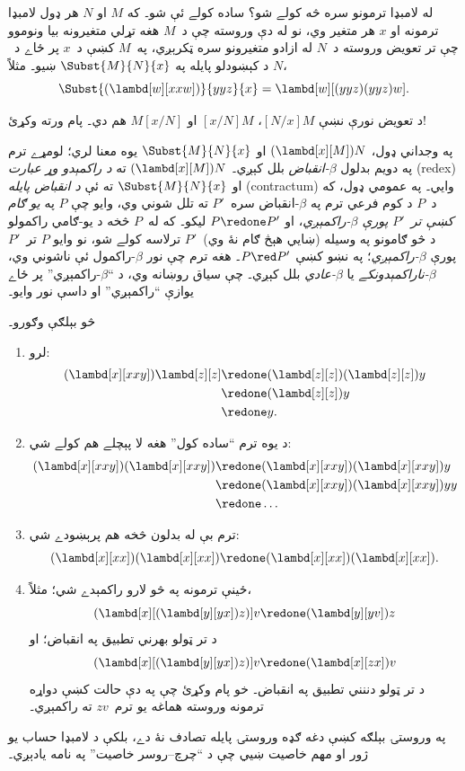 \documentclass[../../../include/open-logic-section]{subfiles}
\begin{document}

له لامبډا ترمونو سره څه کولے شو؟ ساده کولے ئې شو۔ که $M$ او $N$ هر ډول
لامبډا ترمونه او $x$ هر متغير وي، نو له دې وروسته چې د~$M$ هغه تړلي
متغيرونه بيا ونوموو چې تر تعويض وروسته د~$N$ له ازادو متغيرونو سره
ټکرېږي، په~$M$ کښې د~$x$ پر ځاے د~$N$ د کېښودلو پايله په
$\Subst{M}{N}{x}$ ښيو۔ مثلاً،
\[
\Subst{(\lambd[w][xxw])}{yyz}{x} = \lambd[w][(yyz)(yyz)w].
\]

\begin{digress}
د تعويض نورې نښې $[N/x]M$، $[x/N]M$ او $M[x/N]$ هم دي۔ پام
ورته وکړئ!
\end{digress}

په وجداني ډول، $(\lambd[x][M])N$ او $\Subst{M}{N}{x}$ يوه معنا
لري؛ لومړے ترم په دويم بدلول \emph{$\beta$-انقباض} بلل کېږي۔
$(\lambd[x][M])N$ ته \emph{د راکمېدو وړ عبارت} (redex) او
$\Subst{M}{N}{x}$ ته ئې \emph{د انقباض پايله} (contractum) وايي۔
په عمومي ډول، که د~$P$ د کوم فرعي ترم په $\beta$-انقباض سره~$P'$
ته تلل شوني وي، وايو چې $P$ په \emph{يو ګام کښې تر~$P'$ پورې
$\beta$-راکمېږي}، او $P \redone P'$ ليکو۔ که له~$P$ څخه د يو-ګامي
راکمولو د څو ګامونو په وسيله (ښايي هېڅ ګام نۀ وي)~$P'$ ترلاسه کولے
شو، نو وايو $P$ تر~$P'$ پورې \emph{$\beta$-راکمېږي}؛ په نښو کښې
$P \red P'$۔ هغه ترم چې نور $\beta$-راکمول ئې ناشوني وي،
\emph{$\beta$-ناراکمېدونکے} يا \emph{$\beta$-عادي} بلل کېږي۔ چې
سياق روښانه وي، د ``$\beta$-راکمېږي'' پر ځاے يوازې ``راکمېږي'' او
داسې نور وايو۔

څو بېلګې وګورو۔
\begin{enumerate}
\item لرو:
\begin{align*}
(\lambd[x][xxy]) \lambd[z][z] & \redone (\lambd[z][z])(\lambd[z][z]) y \\
& \redone (\lambd[z][z]) y \\
& \redone y.
\end{align*}
\item د يوه ترم ``ساده کول'' هغه لا پېچلے هم کولے شي:
\begin{align*}
(\lambd[x][xxy])(\lambd[x][xxy]) & \redone (\lambd[x][xxy])(\lambd[x][xxy])y \\
& \redone (\lambd[x][xxy])(\lambd[x][xxy])yy \\
& \redone \dots
\end{align*}
\item ترم بې له بدلون څخه هم پرېښودے شي:
\[
(\lambd[x][xx])(\lambd[x][xx]) \redone (\lambd[x][xx])(\lambd[x][xx]).
\]
\item ځينې ترمونه په څو لارو راکمېدے شي؛ مثلاً،
\[
(\lambd[x][(\lambd[y][yx]) z)] v \redone (\lambd[y][yv]) z
\]
د تر ټولو بهرني تطبيق په انقباض؛ او
\[
(\lambd[x][(\lambd[y][yx]) z)] v \redone (\lambd[x][zx]) v
\]
د تر ټولو دننني تطبيق په انقباض۔ خو پام وکړئ چې په دې حالت کښې
دواړه ترمونه وروسته هماغه يو ترم~$zv$ ته راکمېږي۔
\end{enumerate}

په وروستۍ بېلګه کښې دغه ګډه وروستۍ پايله تصادف نۀ دے، بلکې د
لامبډا حساب يو ژور او مهم خاصيت ښيي چې د ``چرچ--روسر خاصيت'' په
نامه يادېږي۔
\end{document}

